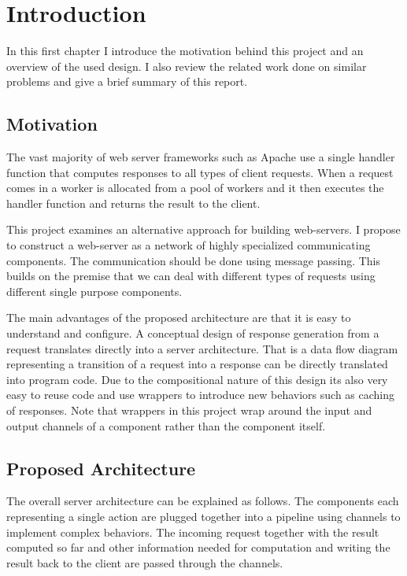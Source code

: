 \section{Introduction}
In this first chapter I introduce the motivation behind this project and 
an overview of the used design. I also review the related work done on similar
problems and give a brief summary of this report. 

\subsection{Motivation}
The vast majority of web server frameworks such as Apache
use a single handler function that
computes responses to all types of client requests. When a request comes in a 
worker is allocated from a pool of workers and it then executes the handler function
and returns the result to the client.

This project examines an alternative approach for building web-servers. 
I propose to construct a web-server as a network of highly specialized 
communicating components. The communication should be done using
message passing. This builds on the premise that we can deal
with different types of requests using different single purpose components.

The main advantages of the proposed architecture are that it is easy to understand
and configure. A conceptual design of response generation from a request translates 
directly into a server architecture. That is a data flow diagram representing a transition
of a request into a response can be directly translated into program code.
Due to the compositional nature of this design its also very easy to reuse code
and use wrappers to introduce new behaviors such as caching of responses.
Note that wrappers in this project wrap around the input and output channels
of a component rather than the component itself.

\subsection{Proposed Architecture}
The overall server architecture can be explained as follows.
The components each representing a single action are plugged together into 
a pipeline using channels to implement complex behaviors. The incoming
request together with the result computed so far and other 
information needed for computation and writing the result back to the client
are passed through the channels.

